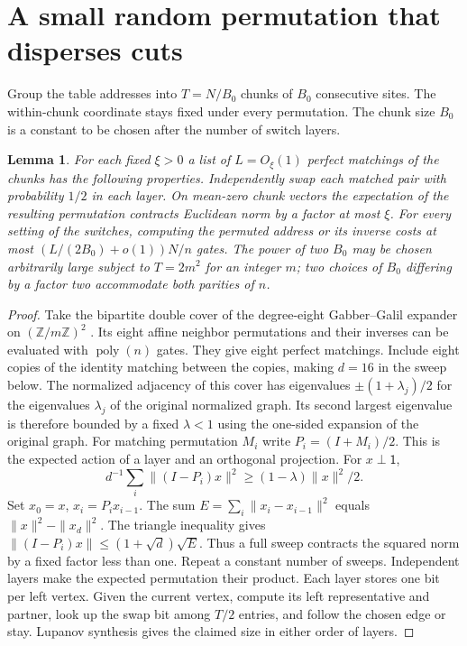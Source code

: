 \documentclass[11pt]{article}
\newtheorem{lemma}[theorem]{Lemma}
\begin{document}
\section{A small random permutation that disperses cuts}

Group the table addresses into $T=N/B_0$ chunks of $B_0$ consecutive sites. The within-chunk coordinate stays fixed under every permutation. The chunk size $B_0$ is a constant to be chosen after the number of switch layers.

\begin{lemma}\label{l:switch}
For each fixed $\xi>0$ a list of $L=O_\xi(1)$ perfect matchings of the chunks has the following properties. Independently swap each matched pair with probability $1/2$ in each layer. On mean-zero chunk vectors the expectation of the resulting permutation contracts Euclidean norm by a factor at most $\xi$. For every setting of the switches, computing the permuted address or its inverse costs at most $(L/(2B_0)+o(1))N/n$ gates. The power of two $B_0$ may be chosen arbitrarily large subject to $T=2m^2$ for an integer $m$; two choices of $B_0$ differing by a factor two accommodate both parities of $n$.
\end{lemma}
\begin{proof}
Take the bipartite double cover of the degree-eight Gabber--Galil expander on $(\mathbb Z/m\mathbb Z)^2$ \cite{gg}. Its eight affine neighbor permutations and their inverses can be evaluated with $\operatorname{poly}(n)$ gates. They give eight perfect matchings. Include eight copies of the identity matching between the copies, making $d=16$ in the sweep below. The normalized adjacency of this cover has eigenvalues $\pm(1+\lambda_j)/2$ for the eigenvalues $\lambda_j$ of the original normalized graph. Its second largest eigenvalue is therefore bounded by a fixed $\lambda<1$ using the one-sided expansion of the original graph. For matching permutation $M_i$ write $P_i=(I+M_i)/2$. This is the expected action of a layer and an orthogonal projection. For $x\perp\mathsf{1}$,
\[
 d^{-1}\sum_i\|(I-P_i)x\|^2\ge(1-\lambda)\|x\|^2/2 .
\]
Set $x_0=x$, $x_i=P_i x_{i-1}$. The sum $E=\sum_i\|x_i-x_{i-1}\|^2$ equals $\|x\|^2-\|x_d\|^2$. The triangle inequality gives $\|(I-P_i)x\|\le(1+\sqrt d)\sqrt E$. Thus a full sweep contracts the squared norm by a fixed factor less than one. Repeat a constant number of sweeps. Independent layers make the expected permutation their product. Each layer stores one bit per left vertex. Given the current vertex, compute its left representative and partner, look up the swap bit among $T/2$ entries, and follow the chosen edge or stay. Lupanov synthesis gives the claimed size in either order of layers.
\end{proof}
\end{document}
